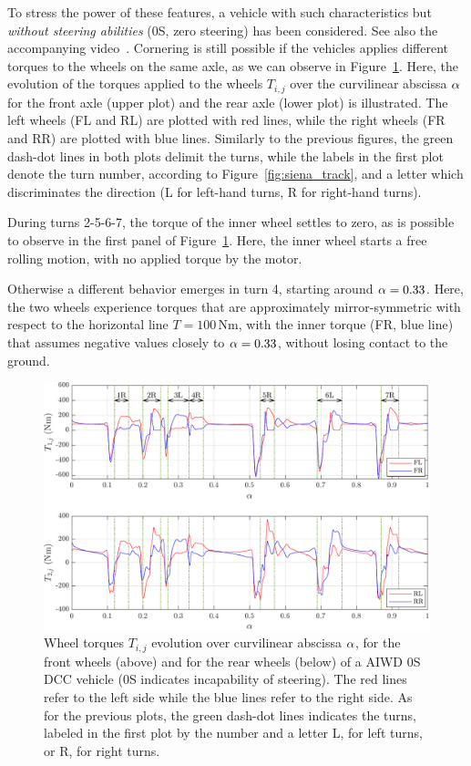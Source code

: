To stress the power of these features, a vehicle with such characteristics but \emph{without steering abilities} (0S, zero steering) has been considered. See also the accompanying video~\cite{video:AWDOSDCC:2024}.
Cornering is still possible if the vehicles applies different torques to the wheels on the same axle, as we can observe in Figure~\ref{fig:awd0sdcc_deltaT}.
Here, the evolution of the torques applied to the wheels $T_{i,j}$ over the curvilinear abscissa $\alpha$ for the front axle (upper plot) and the rear axle (lower plot) is illustrated.
The left wheels (FL and RL) are plotted with red lines, while the right wheels (FR and RR) are plotted with blue lines. Similarly to the previous figures, the green dash-dot lines in both plots delimit the turns, while the labels in the first plot denote the turn number, according to Figure~\ref{fig:siena_track}, and a letter which discriminates the direction (L for left-hand turns, R for right-hand turns).

During turns 2-5-6-7, the torque of the inner wheel settles to zero, as is possible to observe in the first panel of Figure~\ref{fig:awd0sdcc_deltaT}. Here, the inner wheel starts a free rolling motion, with no applied torque by the motor.

Otherwise a different behavior emerges in turn 4, starting around $\alpha=0.33$. Here, the two wheels experience torques that are approximately mirror-symmetric with respect to the horizontal line $T=100$\,Nm, with the inner torque (FR, blue line) that assumes negative values closely to $\alpha=0.33$, without losing contact to the ground.
\begin{figure}[h]
	\centering
	\includegraphics[scale = .8]{Images/DrivingStyles/awd0sdcc_deltaT.pdf}
	\caption{Wheel torques $T_{i,j}$ evolution over curvilinear abscissa $\alpha$, for the front wheels (above) and for the rear wheels (below) of a AIWD 0S DCC vehicle (0S indicates incapability of steering). The red lines refer to the left side while the blue lines refer to the right side. As for the previous plots, the green dash-dot lines indicates the turns, labeled in the first plot by the number and a letter L, for left turns, or R, for right turns.}
	\label{fig:awd0sdcc_deltaT}
\end{figure}

